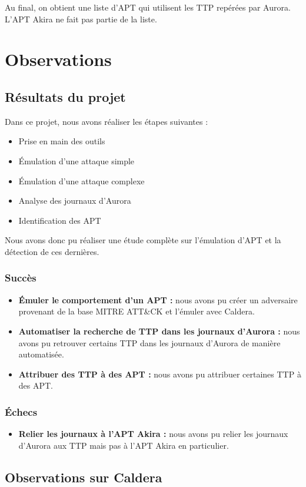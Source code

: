 \documentclass[12pt,letterpaper]{article}
\begin{document}
Au final, on obtient une liste d'APT qui utilisent les TTP repérées par Aurora.
L'APT Akira ne fait pas partie de la liste.

\section{Observations}
\subsection{Résultats du projet}
Dans ce projet, nous avons réaliser les étapes suivantes :
\begin{itemize}
    \item Prise en main des outils
    \item Émulation d'une attaque simple
    \item Émulation d'une attaque complexe
    \item Analyse des journaux d'Aurora
    \item Identification des APT
\end{itemize}
Nous avons donc pu réaliser une étude complète sur l'émulation d'APT et la détection de ces dernières.

\subsubsection{Succès}
\begin{itemize}
    \item \textbf{Émuler le comportement d'un APT :} nous avons pu créer un adversaire provenant de la base MITRE ATT\&CK et l'émuler avec Caldera.
    \item \textbf{Automatiser la recherche de TTP dans les journaux d'Aurora :} nous avons pu retrouver certains TTP dans les journaux d'Aurora de manière automatisée.
    \item \textbf{Attribuer des TTP à des APT :} nous avons pu attribuer certaines TTP à des APT.
\end{itemize}
\subsubsection{Échecs}
\begin{itemize}
    \item \textbf{Relier les journaux à l'APT Akira :} nous avons pu relier les journaux d'Aurora aux TTP mais pas à l'APT Akira en particulier.
\end{itemize}

\subsection{Observations sur Caldera}
\end{document}

